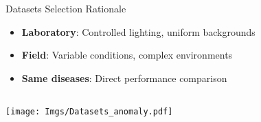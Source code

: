 \documentclass[aspectratio=43]{beamer}
\begin{document}
\begin{frame}
\begin{columns}
\begin{column}{0.3\textwidth}
            \begin{alertblock}{\scriptsize Datasets Selection Rationale}
                \scriptsize
                \begin{itemize}
                    \item \textbf{Laboratory}: Controlled lighting, uniform backgrounds
                    \item \textbf{Field}: Variable conditions, complex environments
                    \item \textbf{Same diseases}: Direct performance comparison
                \end{itemize}
            \end{alertblock}
        \end{column}
    \end{columns}
\end{frame}

\begin{frame}
    \texttt{[image: Imgs/Datasets\_anomaly.pdf]}
\end{frame}
\end{document}
